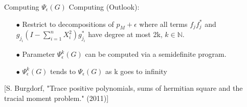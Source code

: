 \documentclass[13.5pt]{beamer}
\begin{document}
\begin{frame}{Computing $\Psi_{\epsilon}(G)$}
Computing (Outlook):
\begin{itemize}
\item[$\bullet$] Restrict to decompositions of $p_M + \epsilon$ where all terms $f_j f_j^*$ and $g_{j_i} (I- \sum_{i=1}^n X_i^2) g_{j_i}^*$ have degree at most 2k, $k\in \mathbb{N}$.
\item[$\bullet$] Parameter $\Psi_{\epsilon}^k(G)$ can be computed via a semidefinite program.
\item[$\bullet$] $\Psi_{\epsilon}^k(G)$ tends to $\Psi_{\epsilon}(G)$ as k goes to infinity
\end{itemize}
{\footnotesize[S. Burgdorf, "Trace positive polynomials, sums of hermitian square and the tracial moment problem." (2011)]}
\end{frame}











\end{document}
